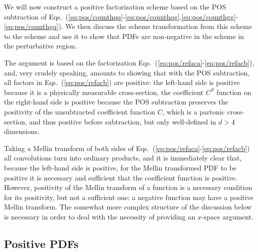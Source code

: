 
We will now construct a positive factorization scheme based on the POS 
subtraction of
Eqs.~(\ref{eq:pos/counthqq}-\ref{eq:pos/counthqg},\ref{eq:pos/counthgg}-\ref{eq:pos/counthgq}).
We then discuss the scheme transformation from this scheme to the
\msbar{} scheme and use it to show that PDFs are non-negative in the
\msbar{} scheme in the perturbative region.

The argument is based on the factorization
Eqs.~(\ref{eq:pos/refaca}-\ref{eq:pos/refacb}), and, very crudely speaking, amounts to
showing that with the POS subtraction, all factors in Eqs.~(\ref{eq:pos/refacb})
are positive: the left-hand side is positive because it is a physically
measurable cross-section, the coefficient $C^S$ function on the right-hand side
is positive because the POS subtraction preserves the positivity of the
unsubtracted coefficient function $C$, which is a partonic cross-section, and
thus positive before subtraction, but only well-defined in $d>4$ dimensions.

Taking a Mellin transform of both sides of
Eqs.~(\ref{eq:pos/refaca}-\ref{eq:pos/refacb}) all convolutions turn into
ordinary products, and it is immediately clear that, because the left-hand
side is positive, for the
Mellin transformed PDF to be positive it is necessary and sufficient
that the coefficient  function is positive. However, 
positivity of the Mellin transform of a function is a necessary
condition for its positivity, but not a sufficient one: a negative
function may have a positive Mellin transform. The somewhat more
complex structure of the discussion below is necessary in order
to deal with the necessity of providing an $x$-space argument.


\subsection{Positive PDFs}
\label{sec:pospdf}


